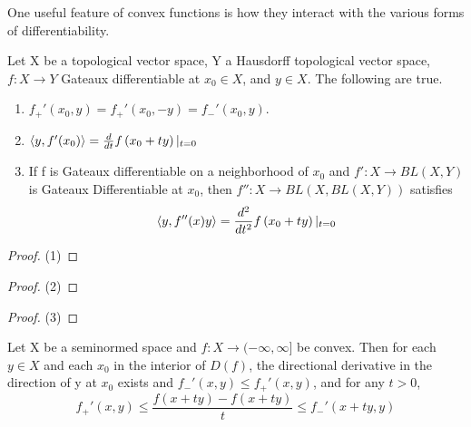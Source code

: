 One useful feature of convex functions is how they interact with the various forms of differentiability. 
\begin{prop}[Gateaux]
    \label{prop:gateaux}
    Let X be a topological vector space, Y a Hausdorff topological vector space, $f:X \to Y$ Gateaux differentiable at $x_0 \in X$, and $y \in X$. The following are true. 
    \begin{enumerate}
        \item $f_+'(x_0,y)=f_+'(x_0,-y)=f_-'(x_0,y).$
        \item $ \left\langle y,f'(x_0) \right\rangle = \frac{d}{dt} f\left( x_0+ty\right) |_{t=0}$
        \item If f is Gateaux differentiable on a neighborhood of $x_0$ and $f':X \to BL(X,Y)$ is Gateaux Differentiable at $x_0$, then $f'':X \to BL(X,BL(X,Y))$ satisfies
        \begin{equation}
            \left\langle y,f''(x)y \right\rangle=\frac{d^2}{dt^2} f\left( x_0+ty\right)|_{t=0}
        \end{equation}
    \end{enumerate}
    \begin{proof}(1)
    \end{proof}
    \begin{proof}(2)
    \end{proof}
    \begin{proof}(3)
    \end{proof} 
\end{prop}

\begin{prop}
    \label{prop:convexdifferentiable}
    Let X be a seminormed space and $f:X \to (-\infty,\infty]$ be convex. Then for each $y \in X$ and each $x_0$ in the interior of $D(f)$, the directional derivative in the direction of y at $x_0$ exists and $f_-'(x,y) \leq f_+'(x,y)$, and for any $t>0$, 
    \begin{equation}
        f_+'(x,y) \leq \frac{f(x+ty)-f(x+ty)}{t} \leq f_-'(x+ty,y)
    \end{equation}
\end{prop} 